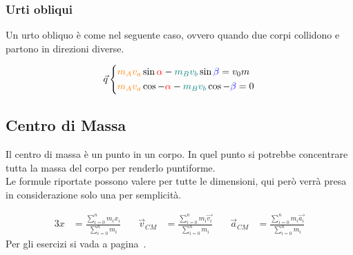 \subsubsection{Urti obliqui}
Un urto obliquo è come nel seguente caso, ovvero quando due corpi collidono e partono in direzioni
diverse.\\
\begin{center}
\end{center}
\begin{equation*}
  \vec{q}
  \begin{cases*}
    \mathcolor{orange}{m_A}\mathcolor{orange}{v_a}\sin\mathcolor{red}{\alpha}-
    \mathcolor{teal}{m_B}\mathcolor{teal}{v_b}\sin\mathcolor{blue}{\beta} = v_0m\\
    \mathcolor{orange}{m_A}\mathcolor{orange}{v_a}\cos-\mathcolor{red}{\alpha}-
    \mathcolor{teal}{m_B}\mathcolor{teal}{v_b}\cos-\mathcolor{blue}{\beta} = 0
  \end{cases*}
\end{equation*}

\subsection{Centro di Massa}\label{subsec:dinamica:cm}
Il centro di massa è un punto in un corpo. In quel punto si potrebbe concentrare tutta la massa del
corpo per renderlo puntiforme.\\
Le formule riportate possono valere per tutte le dimensioni, qui però
verrà presa in considerazione solo una per semplicità.

\begin{alignat*}{3}
  x &= \frac{\sum\limits_{i=0}^{n} m_ix_i}{\sum\limits_{i=0}^{n} m_i} &\quad
  \vec{v}_{CM} &= \frac{\sum\limits_{i=0}^{n} m_i\vec{v_i}}{\sum\limits_{i=0}^{n} m_i} &\quad
  \vec{a}_{CM} &= \frac{\sum\limits_{i=0}^{n} m_i\vec{a_i}}{\sum\limits_{i=0}^{n} m_i}
\end{alignat*}
Per gli esercizi si vada a pagina~\pageref{ex:cm}.

